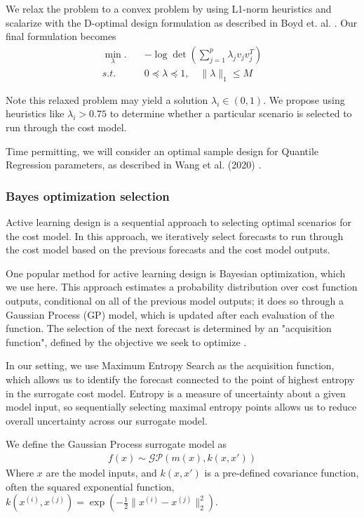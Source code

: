 \documentclass[10pt,twocolumn,letterpaper]{article}
\begin{document}
We relax the problem to a convex problem by using L1-norm heuristics and scalarize with the D-optimal design formulation as described in Boyd et. al. \cite{boyd}. Our final formulation becomes
\begin{align*}
    \min_\lambda. \quad & -\log\det \left(\sum_{j=1}^p\lambda_jv_jv_j^T\right)\\
    s.t. \quad & 0 \preceq \lambda \preceq 1, \quad \lVert\lambda\rVert _1 \leq M
\end{align*}

Note this relaxed problem may yield a solution $\lambda_i \in (0, 1)$. We propose using heuristics like $\lambda_i > 0.75$ to determine whether a particular scenario is selected to run through the cost model.

Time permitting, we will consider an optimal sample design for Quantile Regression parameters, as described in Wang et al. (2020) \cite{wang2020optimal}.

\subsubsection{Bayes optimization selection}
Active learning design is a sequential approach to selecting optimal scenarios for the cost model. In this approach, we iteratively select forecasts to run through the cost model based on the previous forecasts and the cost model outputs.

One popular method for active learning design is Bayesian optimization, which we use here. This approach estimates a probability distribution over cost function outputs, conditional on all of the previous model outputs; it does so through a Gaussian Process (GP) model, which is updated after each evaluation of the function. The selection of the next forecast is determined by an "acquisition function", defined by the objective we seek to optimize \cite{brochu2010tutorial} \cite{wang2022intuitive}. 

In our setting, we use Maximum Entropy Search as the acquisition function, which allows us to identify the forecast connected to the point of highest entropy in the surrogate cost model. Entropy is a measure of uncertainty about a given model input, so sequentially selecting maximal entropy points allows us to reduce overall uncertainty across our surrogate model.

We define the Gaussian Process surrogate model as
\begin{align*}
    f(x) \sim \mathcal{GP}(m(x), k(x, x'))
\end{align*}
Where $x$ are the model inputs, and $k(x, x')$ is a pre-defined covariance function, often the squared exponential function, $k(x^{(i)}, x^{(j)}) = \exp\left(-\frac{1}{2}\lVert x^{(i)} - x^{(j)}\rVert^2_2\right)$. 
\end{document}
